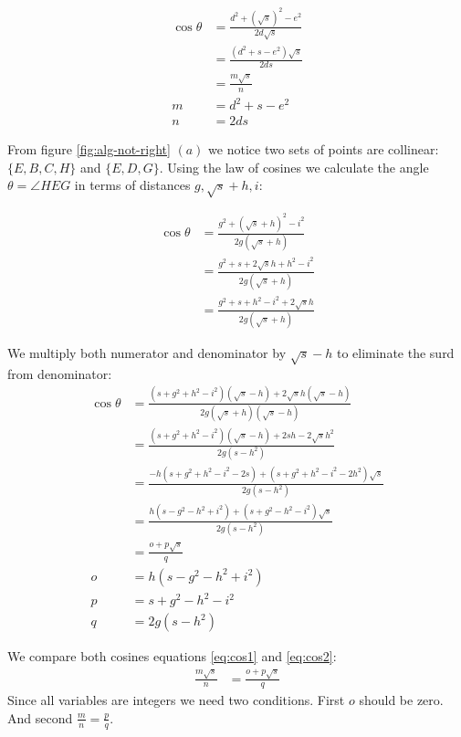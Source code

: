 \documentclass[11pt]{article}
\begin{document}
\begin{align}
\cos\theta &= \frac{d^2 + (\sqrt{s})^2 - e^2}{2d\sqrt{s}} \nonumber\\
 &= \frac{(d^2 + s - e^2)\sqrt{s}}{2ds} \\
 &= \frac{m\sqrt{s}}{n} \label{eq:cos1}\\
 m &= d^2 + s - e^2 \\
 n &= 2ds
\end{align}

From figure \ref{fig:alg-not-right} $(a)$ we notice two sets of points are collinear:
$\{ E,B,C,H \}$ and $\{ E,D,G \}$. Using the law of cosines we calculate the 
angle $\theta = \angle{HEG}$ in terms of distances $g,\sqrt{s}+h,i$:

\begin{align}
\cos\theta &= \frac{g^2 + (\sqrt{s}+h)^2 - i^2}{2g(\sqrt{s}+h)} \nonumber\\
 &= \frac{g^2 + s + 2\sqrt{s}h + h^2 - i^2}{2g(\sqrt{s}+h)} \nonumber\\
 &= \frac{g^2 + s + h^2 - i^2+ 2\sqrt{s}h}{2g(\sqrt{s}+h)}
\end{align}

We multiply both numerator and denominator by $\sqrt{s}-h$ to eliminate the surd from denominator:
\begin{align}
\cos\theta &= \frac{(s + g^2 + h^2 - i^2)(\sqrt{s}-h) + 2\sqrt{s}h(\sqrt{s}-h)}
	{2g(\sqrt{s}+h)(\sqrt{s}-h)} \nonumber\\
 &= \frac{(s + g^2 + h^2 - i^2)(\sqrt{s}-h) + 2sh - 2\sqrt{s}h^2}
	{2g(s-h^2)} \nonumber\\ 
 &= \frac{-h(s + g^2 + h^2 - i^2 - 2s) + (s + g^2 + h^2 - i^2 - 2h^2)\sqrt{s}}
	{2g(s-h^2)} \nonumber\\ 
 &= \frac{h(s - g^2 - h^2 + i^2) + (s + g^2 - h^2 - i^2)\sqrt{s}}
	{2g(s-h^2)} \nonumber\\ 
 &= \frac{o + p\sqrt{s}}{q} \label{eq:cos2}\\
o &= h(s - g^2 - h^2 + i^2) \\
p &= s + g^2 - h^2 - i^2 \\
q &= 2g(s-h^2)
\end{align}

We compare both cosines equations \ref{eq:cos1} and \ref{eq:cos2}:
\begin{align}
\frac{m\sqrt{s}}{n} &= \frac{o + p\sqrt{s}}{q}
\end{align}
Since all variables are integers we need two conditions. First $o$ should be zero.
And second $\frac{m}{n} = \frac{p}{q}$.
\end{document}
